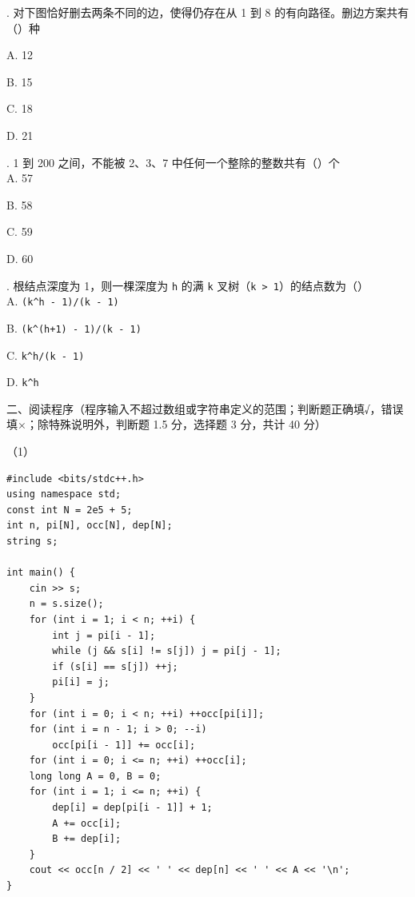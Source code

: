 \documentclass[a4paper]{ctexart}
\newcommand{\bigtitle}[1]{\noindent\heiti #1\par\vspace{2pt}}
\newcommand{\q}[1]{\noindent #1}
\newcommand{\opt}[1]{\hspace*{2em} #1\par}
\begin{document}
\q{13.} 对下图恰好删去两条不同的边，使得仍存在从 1 到 8 的有向路径。删边方案共有（\qquad）种
\begin{center}
\end{center}
\opt{A. 12}\opt{B. 15}\opt{C. 18}\opt{D. 21}

\q{14.} 1 到 200 之间，不能被 2、3、7 中任何一个整除的整数共有（\qquad）个\\
\opt{A. 57}\opt{B. 58}\opt{C. 59}\opt{D. 60}
\q{15.} 根结点深度为 1，则一棵深度为 \texttt{h} 的满 \texttt{k} 叉树（\texttt{k > 1}）的结点数为（\qquad）\\
\opt{A. \texttt{(k\^{}h - 1)/(k - 1)}}\opt{B. \texttt{(k\^{}(h+1) - 1)/(k - 1)}}
\opt{C. \texttt{k\^{}h/(k - 1)}}\opt{D. \texttt{k\^{}h}}

\clearpage
\bigtitle{二、阅读程序（程序输入不超过数组或字符串定义的范围；判断题正确填√，错误填×；除特殊说明外，判断题 1.5 分，选择题 3 分，共计 40 分）}

\noindent（1）
\begin{codebox}\begin{lstlisting}
#include <bits/stdc++.h>
using namespace std;
const int N = 2e5 + 5;
int n, pi[N], occ[N], dep[N];
string s;

int main() {
    cin >> s;
    n = s.size();
    for (int i = 1; i < n; ++i) {
        int j = pi[i - 1];
        while (j && s[i] != s[j]) j = pi[j - 1];
        if (s[i] == s[j]) ++j;
        pi[i] = j;
    }
    for (int i = 0; i < n; ++i) ++occ[pi[i]];
    for (int i = n - 1; i > 0; --i)
        occ[pi[i - 1]] += occ[i];
    for (int i = 0; i <= n; ++i) ++occ[i];
    long long A = 0, B = 0;
    for (int i = 1; i <= n; ++i) {
        dep[i] = dep[pi[i - 1]] + 1;
        A += occ[i];
        B += dep[i];
    }
    cout << occ[n / 2] << ' ' << dep[n] << ' ' << A << '\n';
}
\end{lstlisting}\end{codebox}
\end{document}
